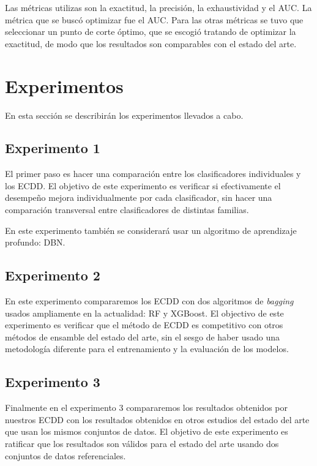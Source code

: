 Las métricas utilizas son la exactitud, la precisión, la exhaustividad y el \ac{AUC}. La métrica que se buscó optimizar fue el \ac{AUC}. Para las otras métricas se tuvo que seleccionar un punto de corte óptimo, que se escogió tratando de optimizar la exactitud, de modo que los resultados son comparables con el estado del arte.

\section{Experimentos}

En esta sección se describirán los experimentos llevados a cabo.

\subsection{Experimento 1}

El primer paso es hacer una comparación entre los clasificadores individuales y los \ac{ECDD}. El objetivo de este experimento es verificar si efectivamente el desempeño mejora individualmente por cada clasificador, sin hacer una comparación transversal entre clasificadores de distintas familias.

En este experimento también se considerará usar un algoritmo de aprendizaje profundo: \ac{DBN}.

\subsection{Experimento 2}

En este experimento compararemos los \ac{ECDD} con dos algoritmos de \textit{bagging} usados ampliamente en la actualidad: \ac{RF} y \ac{XGBoost}. El objectivo de este experimento es verificar que el método de \ac{ECDD} es competitivo con otros métodos de ensamble del estado del arte, sin el sesgo de haber usado una metodología diferente para el entrenamiento y la evaluación de los modelos.

\subsection{Experimento 3}

Finalmente en el experimento 3 compararemos los resultados obtenidos por nuestros \ac{ECDD} con los resultados obtenidos en otros estudios del estado del arte que usan los mismos conjuntos de datos. El objetivo de este experimento es ratificar que los resultados son válidos para el estado del arte usando dos conjuntos de datos referenciales.
